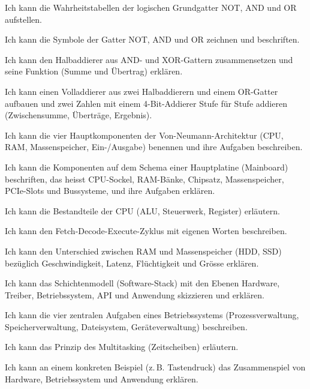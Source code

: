 \begin{todolist}
    \item Ich kann die Wahrheitstabellen der logischen Grundgatter NOT, AND und OR aufstellen.
    \item Ich kann die Symbole der Gatter NOT, AND und OR zeichnen und beschriften.
    \item Ich kann den Halbaddierer aus AND- und XOR-Gattern zusammensetzen und seine Funktion (Summe und Übertrag) erklären.
    \item Ich kann einen Volladdierer aus zwei Halbaddierern und einem OR-Gatter aufbauen und zwei Zahlen mit einem 4-Bit-Addierer Stufe für Stufe addieren (Zwischensumme, Überträge, Ergebnis).
    \item Ich kann die vier Hauptkomponenten der Von-Neumann-Architektur (\gls{CPU}, \gls{RAM}, Massenspeicher, Ein-/Ausgabe) benennen und ihre Aufgaben beschreiben.
    \item Ich kann die Komponenten auf dem Schema einer Hauptplatine (Mainboard) beschriften, das heisst \gls{CPU}-Sockel, \gls{RAM}-Bänke, Chipsatz, Massenspeicher, \gls{PCIe}-Slots und Bussysteme, und ihre Aufgaben erklären.
    \item Ich kann die Bestandteile der \gls{CPU} (\gls{ALU}, Steuerwerk, Register) erläutern.
    \item Ich kann den Fetch-Decode-Execute-Zyklus mit eigenen Worten beschreiben.
    \item Ich kann den Unterschied zwischen \gls{RAM} und Massenspeicher (\gls{HDD}, \gls{SSD}) bezüglich Geschwindigkeit, Latenz, Flüchtigkeit und Grösse erklären.
    \item Ich kann das Schichtenmodell (Software-Stack) mit den Ebenen Hardware, Treiber, Betriebssystem, \gls{API} und Anwendung skizzieren und erklären.
    \item Ich kann die vier zentralen Aufgaben eines Betriebssystems (Prozessverwaltung, Speicherverwaltung, Dateisystem, Geräteverwaltung) beschreiben.
    \item Ich kann das Prinzip des Multitasking (Zeitscheiben) erläutern.
    \item Ich kann an einem konkreten Beispiel (z.\,B. Tastendruck) das Zusammenspiel von Hardware, Betriebssystem und Anwendung erklären.
\end{todolist}

